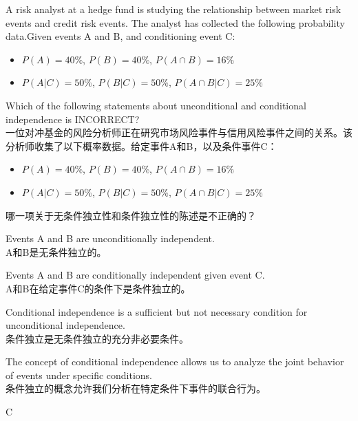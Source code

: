\documentclass{article}
\newcounter{question} %
\begin{document}
\begin{question}
    A risk analyst at a hedge fund is studying the relationship between market risk events and credit risk events. The analyst has collected the following probability data.Given events A and B, and conditioning event C:
    \begin{itemize}
        \item \(P(A) = 40\%\), \(P(B) = 40\%\), \(P(A \cap B) = 16\%\)
        \item \(P(A|C) = 50\%\), \(P(B|C) = 50\%\), \(P(A \cap B|C) = 25\%\)
    \end{itemize}
    
    Which of the following statements about unconditional and conditional independence is INCORRECT?\\
    一位对冲基金的风险分析师正在研究市场风险事件与信用风险事件之间的关系。该分析师收集了以下概率数据。给定事件A和B，以及条件事件C：
    \begin{itemize}
        \item \(P(A) = 40\%\), \(P(B) = 40\%\), \(P(A \cap B) = 16\%\)
        \item \(P(A|C) = 50\%\), \(P(B|C) = 50\%\), \(P(A \cap B|C) = 25\%\)
    \end{itemize}
    
    哪一项关于无条件独立性和条件独立性的陈述是不正确的？
\end{question}

\begin{choices}
    \item Events A and B are unconditionally independent.\\
    A和B是无条件独立的。
    \item Events A and B are conditionally independent given event C.\\
    A和B在给定事件C的条件下是条件独立的。
    \item Conditional independence is a sufficient but not necessary condition for unconditional independence.\\
    条件独立是无条件独立的充分非必要条件。
    \item The concept of conditional independence allows us to analyze the joint behavior of events under specific conditions.\\
    条件独立的概念允许我们分析在特定条件下事件的联合行为。
\end{choices}

\begin{correctanswer}
    C
\end{correctanswer}
\end{document}
